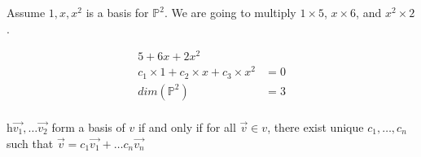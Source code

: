   \begin{problem}
    Assume $1,x,x^2$ is a basis for $\mathbb{P}^2$. We are going to multiply $1\times5$, $x\times6$, and $x^2\times2$.

    \begin{align}
      5+6x+2x^2&\\
      c_1\times1+c_2\times x+c_3\times x^2&=0\\
      dim(\mathbb{P}^2)&=3\\
    \end{align}
  \end{problem}

  \begin{theorem}
   h$\vec{v_1},\dots\vec{v_2}$ form a basis of $v$ if and only if for all $\vec{v}\in v$, there exist unique $c_{1},\dots,c_{n}$ such that $\vec{v}=c_1\vec{v_1}+\dots c_n\vec{v_n}$
  \end{theorem}

